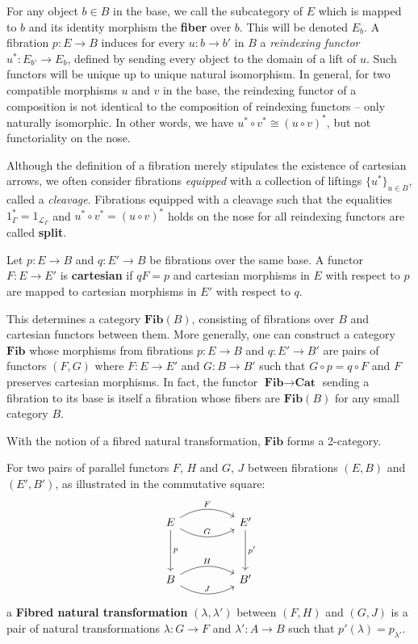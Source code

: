 For any object $b \in B$ in the base, we call the subcategory of $E$ which is mapped to $b$ and its identity morphism the \textbf{fiber} over $b$. This will be denoted $E_b$.
A fibration $p : E \to B$ induces for every $u : b \to b'$ in $B$ a \textit{reindexing functor} $u^*: E_{b'} \to E_{b}$, defined by sending every object to the domain of a lift of $u$. Such functors will be unique up to unique natural isomorphism. In general, for two compatible morphisms $u$ and $v$ in the base, the reindexing functor of a composition is not identical to the composition of reindexing functors -- only naturally isomorphic. In other words, we have $u^* \circ v^* \cong (u \circ v)^*$, but not functoriality on the nose.

Although the definition of a fibration merely stipulates the existence of cartesian arrows, we often consider fibrations \textit{equipped} with a collection of liftings $\{u^*\}_{u \in B}$, called a \textit{cleavage}. Fibrations equipped with a cleavage such that the equalities $1_\Gamma^* = 1_{\mathcal{L}_\Gamma}$ and $u^* \circ v^* = (u \circ v)^*$ holds on the nose for all reindexing functors are called \textbf{split}.

\begin{defn}
Let $p : E \to B$ and $q : E' \to B$ be fibrations over the same base. A functor $F : E \to E'$ is \textbf{cartesian} if $qF = p$ and cartesian morphisms in $E$ with respect to $p$ are mapped to cartesian morphisms in $E'$ with respect to $q$.
\end{defn}
This determines a category $\textbf{Fib}(B)$, consisting of fibrations over $B$ and cartesian functors between them. More generally, one can construct a category $\textbf{Fib}$ whose morphisms from fibrations $p : E \to B$ and $q : E' \to B'$ are pairs of functors $(F, G)$ where $F : E \to E'$ and $G : B \to B'$ such that $G \circ p = q \circ F$ and $F$ preserves cartesian morphisms. In fact, the functor $\textbf{Fib} \to \textbf{Cat}$ sending a fibration to its base is itself a fibration whose fibers are $\textbf{Fib}(B)$ for any small category $B$.


With the notion of a fibred natural transformation, $\mathbf{Fib}$ forms a 2-category.
\begin{defn}
For two pairs of parallel functors $F$, $H$ and $G$, $J$ between fibrations $(E, B)$ and $(E', B')$, as illustrated in the commutative square:
\[
\ti
E \ar[d, "p"] \ar[r, "F", bend left] \ar[r, "G", bend right] & E' \ar[d, "{p'}"]\\
B \ar[r, "H", bend left] \ar[r, "J", bend right] & B'
\kz
\]
a \textbf{Fibred natural transformation} $(\lambda, \lambda')$ between $(F, H)$ and $(G, J)$ is a pair of natural transformations $\lambda : G \to F$ and $\lambda' : A \to B$ such that $p'(\lambda) = p_{\lambda'}$.
\end{defn}

